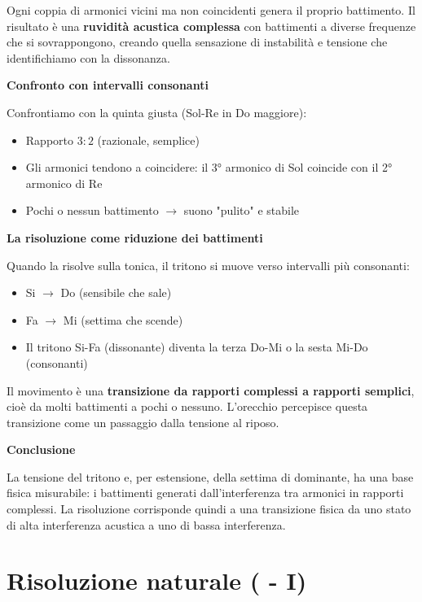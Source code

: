 \begin{fisica}
	Ogni coppia di armonici vicini ma non coincidenti genera il proprio battimento. Il risultato è una \textbf{ruvidità acustica complessa} con battimenti a diverse frequenze che si sovrappongono, creando quella sensazione di instabilità e tensione che identifichiamo con la dissonanza.
	
	\textbf{Confronto con intervalli consonanti}
	
	Confrontiamo con la quinta giusta (Sol-Re in Do maggiore):
	\begin{itemize}
		\item Rapporto $3:2$ (razionale, semplice)
		\item Gli armonici tendono a coincidere: il 3° armonico di Sol coincide con il 2° armonico di Re
		\item Pochi o nessun battimento $\rightarrow$ suono "pulito" e stabile
	\end{itemize}
	
	\textbf{La risoluzione come riduzione dei battimenti}
	
	Quando la  risolve sulla tonica, il tritono si muove verso intervalli più consonanti:
	\begin{itemize}
		\item Si $\rightarrow$ Do (sensibile che sale)
		\item Fa $\rightarrow$ Mi (settima che scende)
		\item Il tritono Si-Fa (dissonante) diventa la terza Do-Mi o la sesta Mi-Do (consonanti)
	\end{itemize}
	
	Il movimento è una \textbf{transizione da rapporti complessi a rapporti semplici}, cioè da molti battimenti a pochi o nessuno. L'orecchio percepisce questa transizione come un passaggio dalla tensione al riposo.
	
	\textbf{Conclusione}
	
	La tensione del tritono e, per estensione, della settima di dominante, ha una base fisica misurabile: i battimenti generati dall'interferenza tra armonici in rapporti complessi. La risoluzione corrisponde quindi a una transizione fisica da uno stato di alta interferenza acustica a uno di bassa interferenza.
\end{fisica}

\section{Risoluzione naturale ( - I)}
\label{sec:risoluzione_v7}

